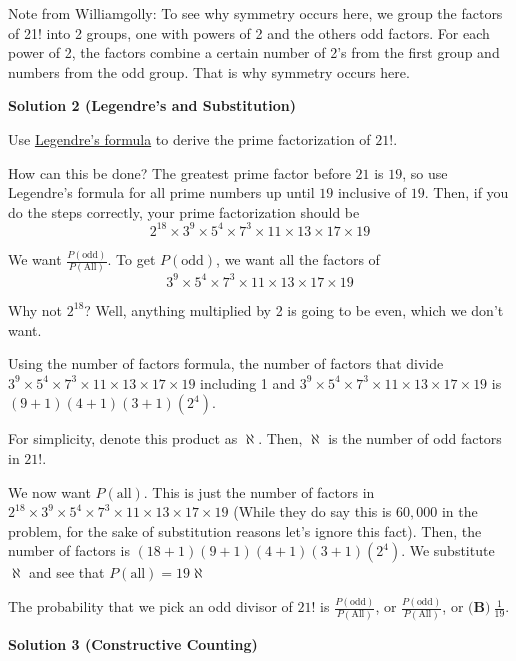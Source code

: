 \begin{enumerate}
 Note from Williamgolly: To see why symmetry occurs here, we group the factors of 21! into 2 groups, one with powers of 2 and the others odd factors. For each power of 2, the factors combine a certain number of 2's from the first group and numbers from the odd group. That is why symmetry occurs here.

 



\textbf{Solution 2 (Legendre's and Substitution)}

Use \href{https://artofproblemsolving.com/wiki/index.php/Legendre\%27s\_Formula}{Legendre's formula} to derive the prime factorization of $21!$.

 How can this be done? The greatest prime factor before $21$ is $19$, so use Legendre's formula for all prime numbers up until $19$ inclusive of $19$. Then, if you do the steps correctly, your prime factorization should be
 \[2^{18} \times 3^9 \times 5^4 \times 7^3 \times 11 \times 13 \times 17 \times 19\]

 We want \(\frac{P(\text{odd})}{P(\text{All})}\). To get \(P(\text{odd})\), we want all the factors of
 \[3^9 \times 5^4 \times 7^3 \times 11 \times 13 \times 17 \times 19\]

 Why not $2^{18}$? Well, anything multiplied by 2 is going to be even, which we don't want.

 Using the number of factors formula, the number of factors that divide $3^9 \times 5^4 \times 7^3 \times 11 \times 13 \times 17 \times 19$ including 1 and $3^9 \times 5^4 \times 7^3 \times 11 \times 13 \times 17 \times 19$ is $(9+1)(4+1)(3+1)(2^4)$.

 For simplicity, denote this product as \(\aleph\). Then, $\aleph$ is the number of odd factors in $21!$.

 We now want \(P(\text{all})\). This is just the number of factors in $2^{18} \times 3^9 \times 5^4 \times 7^3 \times 11 \times 13 \times 17 \times 19$ (While they do say this is $60,000$ in the problem, for the sake of substitution reasons let's ignore this fact). Then, the number of factors is \((18+1)(9+1)(4+1)(3+1)(2^4)\). We substitute $\aleph$ and see that $P(\text{all}) = 19\aleph$

 The probability that we pick an odd divisor of $21!$ is $\frac{P(\text{odd})}{P(\text{All})}$, or $\frac{P(\text{odd})}{P(\text{All})}$, or $\boxed{\textbf{(B)} ~\frac{1}{19}}$.

 



\textbf{Solution 3 (Constructive Counting)}


\end{enumerate}
